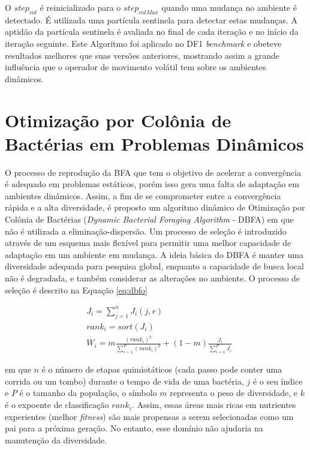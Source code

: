 \noindent O $step_{vol}$ é reinicializado para o $step_{volMax}$ quando uma mudança no ambiente é detectado. É utilizada uma partícula sentinela para detectar estas mudanças. A aptidão da partícula sentinela é avaliada no final de cada iteração e no início da iteração seguinte. Este Algoritmo foi aplicado no DF1 \textit{benchmark} e obeteve resultados melhores que suas versões anteriores, mostrando assim a grande influência que o operador de movimento volátil tem sobre os ambientes dinâmicos.

\section{Otimização por Colônia de Bactérias em Problemas Dinâmicos}
\label{sec:bfo_behaviour}

O processo de reprodução da BFA que tem o objetivo de acelerar a convergência é adequado em problemas estáticos, porém isso gera uma falta de adaptação em ambientes dinâmicos. Assim, a fim de se comprometer entre a convergência rápida e a alta diversidade, é proposto um algoritmo dinâmico de Otimização por Colônia de Bactérias (\textit{Dynamic Bacterial Foraging Algorithm} - DBFA) \cite{passino2002biomimicry} em que não é utilizada a eliminação-dispersão. Um processo de seleção é introduzido através de um esquema mais flexível para permitir uma melhor capacidade de adaptação em um ambiente em mudança. A ideia básica do DBFA é manter uma diversidade adequada para pesquisa global, enquanto a capacidade de busca local não é degradada, e também considerar as alterações no ambiente. O processo de seleção é descrito na Equação \ref{eq:dbfo}

\begin{equation}
\label{eq:dbfo}
\begin{split}
& J_i = \sum_{j=1}^{n} J_i(j,r) \\
& rank_i = sort(J_i) \\
& W_i = m \frac{(rank_i)^k}{\sum_{i=1}^{P} (rank_i)^k} + (1 - m) \frac{J_i}{\sum_{i=1}^{P} J_i}
\end{split}
\end{equation}

\noindent em que $n$ é o número de etapas quimiotáticos (cada passo pode conter uma corrida ou um tombo) durante o tempo de vida de uma bactéria, $j$ é o seu índice e $P$ é o tamanho da população, o símbolo $m$ representa o peso de diversidade, e $k$ é o expoente de classificação $rank_i$. Assim, essas áreas mais ricas em nutrientes experientes (melhor \textit{fitness}) são mais propensas a serem selecionadas como um pai para a próxima geração. No entanto, esse domínio não ajudaria na manutenção da diversidade.

